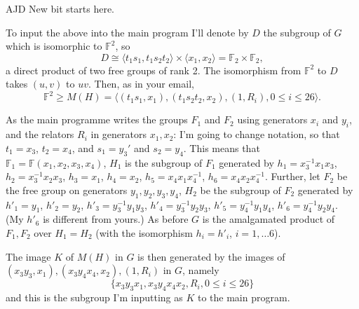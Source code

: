 \documentclass[a4paper,12pt]{article}
\numberwithin{equation}{section}
\numberwithin{figure}{section}
\newcommand{\FF}{\ensuremath{\mathbb{F}}}
\newcommand{\la}{\langle}
\newcommand{\ra}{\rangle}
\newenvironment{ajd1}{\noindent\color{red} AJD }{}
\newcommand{\ajd}[1]{\begin{ajd1} #1 \end{ajd1}}
\begin{document}
\ajd{New bit starts here.\\} 

To input the above into the main program I'll denote by $D$ 
the subgroup of $G$ which is isomorphic to  
$\FF^2$, so 
\[D\cong \la t_1s_1,t_1s_2t_2\ra\times \la x_1,x_2\ra=\FF_2\times \FF_2,\]
a direct product of two free groups of rank 2. The isomorphism from
$\FF^2$ to $D$ takes $(u,v)$ to $uv$. Then, as in your email, 
\[\FF^2\ge M(H)=\la (t_1s_1,x_1), (t_1s_2t_2,x_2), (1,R_i), 0\le i \le 26\ra.\]


As the main programme writes the groups $F_1$ and $F_2$ using generators 
$x_i$ and $y_i$, and the relators $R_i$ in generators $x_1,x_2$: 
 I'm going to change notation, so that $t_1=x_3$, $t_2=x_4$, and  
 $s_1=y_3'$ and $s_2=y_4$. This means
that \\
$\FF_1= \FF(x_1,x_2,x_3, x_4)$,
$H_1$ is the subgroup of $F_1$ generated by 
$h_1= x_3^{-1} x_1 x_3$, 
$h_2 = x_3^{-1} x_2 x_3$, 
$h_3 =x_1$, 
$h_4 = x_2$,
$h_5= x_4 x_1 x_4^{-1}$, 
$h_6 = x_4 x_2 x_4^{-1}$.
Further, let $F_2$ be the free group on generators $y_1, y_2, y_3, y_4$,
$H_2$ be the subgroup of $F_2$ generated by 
$h'_1= y_1$, 
$h'_2 = y_2$, 
$h'_3 = y_3^{-1} y_1 y_3 $, 
$h'_4 = y_3^{-1} y_2 y_3$,
$h'_5= y_4^{-1} y_1 y_4$, 
$h'_6 = y_4^{-1} y_2 y_4$.
(My $h'_6$ is different from yours.)
As before $G$ is the amalgamated product  of $F_1, F_2$ over $H_1=H_2$ (with the isomorphism $h_i = h'_i$, $i = 1,\ldots 6$).

The image $K$ of $M(H)$ in $G$ is then generated by 
the images of $ (x_3y_3,x_1), (x_3y_4x_4,x_2), (1,R_i)$ in $G$, namely 
\[\{x_3y_3x_1, x_3y_4x_4x_2, R_i, 0\le i \le 26\}\]
and this is the subgroup I'm inputting as $K$ to the main program.
\end{document}
